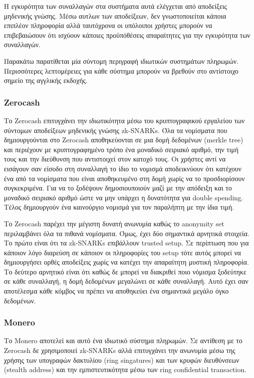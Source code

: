 Η εγκυρότητα των συναλλαγών στα συστήματα αυτά ελέγχεται από αποδείξεις μηδενικής γνώσης. Μέσω αυτλων των αποδείξεων, δεν γνωστοποιείται κάποια επιπλέον πληροφορία αλλά ταυτόχρονα οι υπόλοιποι χρήστες μπορούν να επιβεβαιώσουν ότι ισχύουν κάποιες προϋπόθέσεις απαραίτητες για την εγκυρότητα των συναλλαγών.

Παρακάτω παρατίθεται μία σύντομη περιγραφή ιδιωτικών συστημάτων πληρωμών. Περισσότερες λεπτομέρειες για κάθε σύστημα μπορούν να βρεθούν στο αντίστοιχο σημείο της αγγλικής εκδοχής.

\subsubsection{Zerocash}
Το Zerocash επιτυγχάνει την ιδιωτικότητα μέσω του κρυπτογραφικού εργαλείου των σύντομων αποδείξεων μηδενικής γνώσης zk-SNARKs. Όλα τα νομίσματα που δημιουργούνται στο Zerocash αποθηκεύονται σε μια δομή δεδομένων (merkle tree) και περιέχουν με κρυπτογραφημένο τρόπο ένα μοναδικό σειριακό αριθμό, την τιμή τους και την διεύθυνση που αντιστοιχεί στον κατοχό τους. Οι χρήστες αντί να εισάγουν σαν είσοδο στη συναλλαγή το ίδιο το νομισμά αποδεικνύουν ότι κατέχουν ένα από τα νομίσματα που είναι αποθηκευμένο στη δομή χωρίς να το προσδιορίσουν συγκεκριμένα. Για να το ξοδέψουν δημοσιουποιούν μαζί με την απόδειξη και το μοναδικό σειριακό αριθμό ώστε να μην υπάρχει η δυνατότητα για double spending. Τέλος δημιουργούν ένα καινούργιο νομισμά για τον παραλήπτη με την ίδια τιμή.

Το Zerocash παρέχει την μέγιστη δυνατή ανωνυμία καθώς το anonymity set περιλαμβάνει όλα τα πιθανά νομίσματα. Όμως, έχει δύο σημαντικά αρνητικά στοιχεία. Το πρώτο είναι ότι τα zk-SNARKs επιβάλλουν trusted setup. Σε περίπτωση που για κάποιον λόγο διαρεύση σε κάποιον οι πληροφορίες του setup τότε αυτός μπορεί να δημιουργήσει ορθές αποδείξεις χωρίς να κατέχει την απαραίτητη μυστική πληροφορία. Το δεύτερο αρνητικό είναι ότι καθώς δε μπορεί να διακριθεί ποιο νόμισμα ξοδεύτηκε σε κάθε συναλλαγή, η δομή δεδομένων μεγαλώνει σε κάθε συναλλαγή. Αυτό έχει σαν αποτέλεσμα κάθε κόμβος να πρέπει να αποθηκεύει ένα σημαντικά μεγάλο όγκο δεδομένων.

\subsubsection{Monero}
Το Monero αποτελεί και αυτό ένα ιδιωτικό σύστημα πληρωμών. Σε αντίθεση με το Zerocash δε χρησιμοποιεί zk-SNARKs αλλά επιτυγχάνει την ανωνυμία μέσω της χρήσης των υπογραφών δακτυλίου (ring singatures) και των κρυφών διευθύνσεων (stealth address) και την εμπιστευτικότητα μέσω των ring confidential transaction. 

